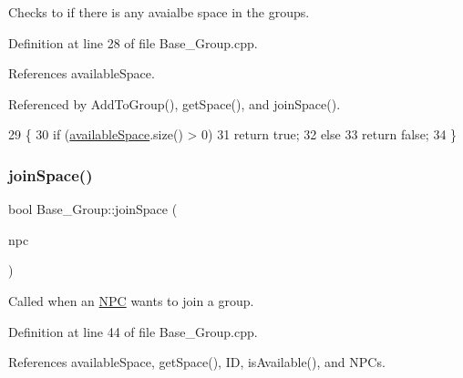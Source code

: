 Checks to if there is any avaialbe space in the groups. 



Definition at line 28 of file Base\+\_\+\+Group.\+cpp.



References available\+Space.



Referenced by Add\+To\+Group(), get\+Space(), and join\+Space().


\begin{DoxyCode}
29 \{
30     \textcolor{keywordflow}{if} (\hyperlink{class_base___group_a8eb46d3107d53da0f5fbea2410b4b095}{availableSpace}.size() > 0)
31         \textcolor{keywordflow}{return} \textcolor{keyword}{true};
32     \textcolor{keywordflow}{else}
33         \textcolor{keywordflow}{return} \textcolor{keyword}{false};
34 \}
\end{DoxyCode}
\mbox{\label{class_base___group_a76d7d9c0f35019dfaf7b2631eda863e1}} 
\subsubsection{\texorpdfstring{join\+Space()}{joinSpace()}}
{\footnotesize\ttfamily bool Base\+\_\+\+Group\+::join\+Space (\begin{DoxyParamCaption}\item[{std\+::shared\+\_\+ptr$<$ \hyperlink{class_n_p_c}{N\+PC} $>$}]{npc }\end{DoxyParamCaption})}



Called when an \hyperlink{class_n_p_c}{N\+PC} wants to join a group. 



Definition at line 44 of file Base\+\_\+\+Group.\+cpp.



References available\+Space, get\+Space(), ID, is\+Available(), and N\+P\+Cs.


